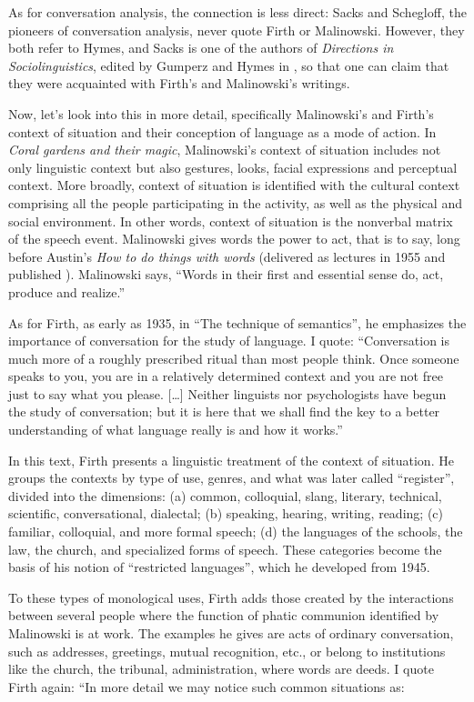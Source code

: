 \documentclass[output=paper]{langscibook}
\begin{document}
As for conversation analysis, the connection is less direct: Sacks and Schegloff, the pioneers of conversation analysis, never quote Firth or Malinowski. However, they both refer to Hymes, and Sacks is one of the authors of \textit{Directions in Sociolinguistics}, edited by Gumperz and Hymes in \citeyear{gumperz1972a}, so that one can claim that they were acquainted with Firth’s and Malinowski’s writings. 

Now, let’s look into this in more detail, specifically Malinowski’s and Firth’s context of situation and their conception of language as a mode of action. In \textit{Coral gardens and their magic}, Malinowski’s context of situation includes not only linguistic context but also gestures, looks, facial expressions and perceptual context. More broadly, context of situation is identified with the cultural context comprising all the people participating in the activity, as well as the physical and social environment. In other words, context of situation is the nonverbal matrix of the speech event. Malinowski gives words the power to act, that is to say, long before Austin’s \textit{How to do things with words} (delivered as lectures in 1955 and published \citeyear{austin1962a}). Malinowski says, “Words in their first and essential sense do, act, produce and realize.”

As for Firth, as early as 1935, in “The technique of semantics”, he emphasizes the importance of conversation for the study of language. I quote: “Conversation is much more of a roughly prescribed ritual than most people think. Once someone speaks to you, you are in a relatively determined context and you are not free just to say what you please. […] Neither linguists nor psychologists have begun the study of conversation; but it is here that we shall find the key to a better understanding of what language really is and how it works.” 

In this text, Firth presents a linguistic treatment of the context of situation. He groups the contexts by type of use, genres, and what was later called “register”, divided into the dimensions: (a) common, colloquial, slang, literary, technical, scientific, conversational, dialectal; (b) speaking, hearing, writing, reading; (c) familiar, colloquial, and more formal speech; (d) the languages of the schools, the law, the church, and specialized forms of speech. These categories become the basis of his notion of ``restricted languages'', which he developed from 1945. 

To these types of monological uses, Firth adds those created by the interactions between several people where the function of phatic communion identified by Malinowski is at work. The examples he gives are acts of ordinary conversation, such as addresses, greetings, mutual recognition, etc., or belong to institutions like the church, the tribunal, administration, where words are deeds. I quote Firth again: “In more detail we may notice such common situations as:
\end{document}
